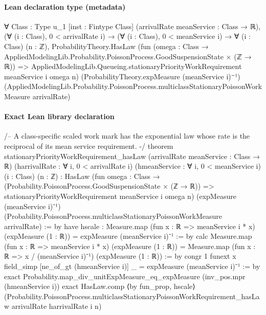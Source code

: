\documentclass[10pt]{article}
\begin{document}
\paragraph{Lean declaration type (metadata)}
\begin{ReviewVerbatim}
∀ {Class : Type u_1} [inst : Fintype Class] (arrivalRate meanService : Class → ℝ),
  (∀ (i : Class), 0 < arrivalRate i) →
    (∀ (i : Class), 0 < meanService i) →
      ∀ (i : Class) (n : ℤ),
        ProbabilityTheory.HasLaw
          (fun (omega : Class → AppliedModelingLib.Probability.PoissonProcess.GoodSuspensionState × (ℤ → ℝ)) =>
            AppliedModelingLib.Queueing.stationaryPriorityWorkRequirement meanService i omega n)
          (ProbabilityTheory.expMeasure (meanService i)⁻¹)
          (AppliedModelingLib.Probability.PoissonProcess.multiclassStationaryPoissonWorkMeasure arrivalRate)
\end{ReviewVerbatim}

\paragraph{Exact Lean library declaration}
\begin{ReviewVerbatim}
/-- A class-specific scaled work mark has the exponential law whose rate is
the reciprocal of its mean service requirement. -/
theorem stationaryPriorityWorkRequirement_hasLaw
    (arrivalRate meanService : Class → ℝ)
    (harrivalRate : ∀ i, 0 < arrivalRate i)
    (hmeanService : ∀ i, 0 < meanService i)
    (i : Class) (n : ℤ) :
    HasLaw (fun omega : Class →
      (Probability.PoissonProcess.GoodSuspensionState × (ℤ → ℝ)) =>
        stationaryPriorityWorkRequirement meanService i omega n)
      (expMeasure (meanService i)⁻¹)
      (Probability.PoissonProcess.multiclassStationaryPoissonWorkMeasure arrivalRate) := by
  have hscale :
      Measure.map (fun x : ℝ => meanService i * x) (expMeasure (1 : ℝ)) =
        expMeasure (meanService i)⁻¹ := by
    calc
      Measure.map (fun x : ℝ => meanService i * x) (expMeasure (1 : ℝ)) =
          Measure.map (fun x : ℝ => x / (meanService i)⁻¹) (expMeasure (1 : ℝ)) := by
            congr 1
            funext x
            field_simp [ne_of_gt (hmeanService i)]
      _ = expMeasure (meanService i)⁻¹ := by
            exact Probability.map_div_unitExpMeasure_eq_expMeasure
              (inv_pos.mpr (hmeanService i))
  exact HasLaw.comp
    ⟨by fun_prop, hscale⟩
    (Probability.PoissonProcess.multiclassStationaryPoissonWorkRequirement_hasLaw
      arrivalRate harrivalRate i n)
\end{ReviewVerbatim}
\end{document}
